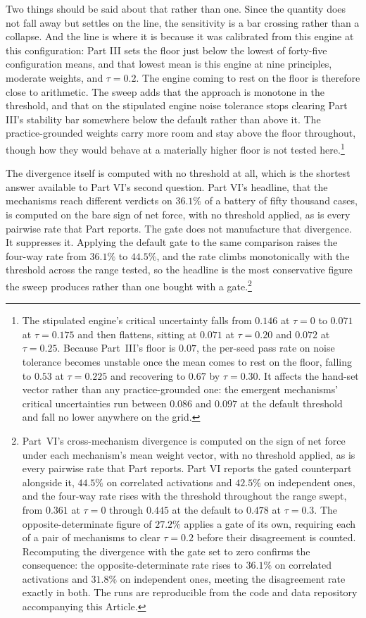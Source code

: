 Two things should be said about that rather than one. Since the quantity
does not fall away but settles on the line, the sensitivity is a bar
crossing rather than a collapse. And the line is where it is because it was calibrated from this
engine at this configuration: Part III sets the floor just below the lowest of
forty-five configuration means, and that lowest mean is this engine at nine
principles, moderate weights, and $\tau = 0.2$. The engine coming to rest on
the floor is therefore close to arithmetic. The sweep adds that the
approach is monotone in the threshold, and that on the stipulated engine noise
tolerance stops clearing Part III's stability bar somewhere below the default
rather than above it. The practice-grounded weights carry more room and stay above the floor
throughout, though how they would behave at a materially higher floor is
not tested here.\footnote{The stipulated engine's
critical uncertainty falls from $0.146$ at $\tau = 0$ to $0.071$ at
$\tau = 0.175$ and then flattens, sitting at $0.071$ at $\tau = 0.20$ and
$0.072$ at $\tau = 0.25$. Because Part~III's floor is $0.07$, the
per-seed pass rate on noise tolerance becomes unstable once the mean
comes to rest on the floor, falling to $0.53$ at $\tau = 0.225$ and
recovering to $0.67$ by $\tau = 0.30$. It affects the hand-set vector
rather than any practice-grounded one: the emergent mechanisms' critical
uncertainties run between $0.086$ and $0.097$ at the default threshold
and fall no lower anywhere on the grid.}

The divergence itself is computed with no threshold at all, which is the
shortest answer available to Part VI's second question. Part VI's
headline, that the mechanisms reach different verdicts on $36.1\%$ of a
battery of fifty thousand cases, is computed on the bare sign of net
force, with no threshold applied, as is every pairwise rate that Part reports.
The gate does not manufacture that divergence. It suppresses it. Applying the
default gate to the same comparison raises the four-way rate from $36.1\%$ to
$44.5\%$, and the rate climbs monotonically with the threshold across the
range tested, so the headline is the most conservative figure the sweep
produces rather than one bought with a gate.\footnote{Part~VI's cross-mechanism divergence is computed on the
sign of net force under each mechanism's mean weight vector, with no threshold
applied, as is every pairwise rate that Part reports. Part VI reports the
gated counterpart alongside it, $44.5\%$ on correlated activations and
$42.5\%$ on independent ones, and the four-way rate rises with the threshold
throughout the range swept, from $0.361$ at $\tau = 0$ through $0.445$ at the
default to $0.478$ at $\tau = 0.3$. The opposite-determinate figure of
$27.2\%$ applies a gate of its own, requiring each of a pair of mechanisms to
clear $\tau = 0.2$ before their disagreement is
counted. Recomputing the divergence with the gate set to zero
confirms the consequence: the opposite-determinate rate rises to
$36.1\%$ on correlated activations and $31.8\%$ on independent ones,
meeting the disagreement rate exactly in both. The runs are reproducible
from the code and data repository accompanying this Article.}

